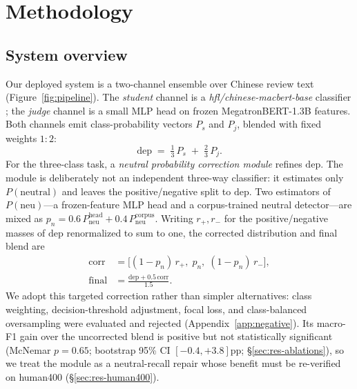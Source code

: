 
\section{Methodology}
\label{sec:method}

\subsection{System overview}
\label{sec:method:system}

Our deployed system is a two-channel ensemble over Chinese review text
(Figure~\ref{fig:pipeline}). The \emph{student} channel is a
\emph{hfl/chinese-macbert-base} classifier \citep{cui2020macbert}; the
\emph{judge} channel is a small MLP head on frozen
MegatronBERT-1.3B features. Both channels emit class-probability
vectors $P_s$ and $P_j$, blended with fixed weights $1{:}2$:
\begin{equation}
  \mathrm{dep} \;=\; \tfrac{1}{3}\,P_s \;+\; \tfrac{2}{3}\,P_j .
  \label{eq:dep}
\end{equation}
For the three-class task, a \emph{neutral probability correction
module} refines $\mathrm{dep}$. The module is deliberately not an
independent three-way classifier: it estimates only
$P(\mathrm{neutral})$ and leaves the positive/negative split to
$\mathrm{dep}$. Two estimators of $P(\mathrm{neu})$---a frozen-feature
MLP head and a corpus-trained neutral detector---are mixed as
$p_n = 0.6\,P_{\mathrm{neu}}^{\mathrm{head}} +
0.4\,P_{\mathrm{neu}}^{\mathrm{corpus}}$. Writing $r_{+}, r_{-}$ for the
positive/negative masses of $\mathrm{dep}$ renormalized to sum to one, the
corrected distribution and final blend are
\begin{equation}
  \begin{aligned}
    \mathrm{corr} &= \big[(1-p_n)\,r_{+},\; p_n,\; (1-p_n)\,r_{-}\big],\\
    \mathrm{final} &= \frac{\mathrm{dep} + 0.5\,\mathrm{corr}}{1.5}.
  \end{aligned}
  \label{eq:spec}
\end{equation}
We adopt this targeted correction rather than simpler alternatives:
class weighting, decision-threshold adjustment, focal loss, and
class-balanced oversampling were evaluated and rejected
(Appendix~\ref{app:negative}). Its macro-F1 gain over the
uncorrected blend is positive but not statistically significant
(McNemar $p{=}0.65$; bootstrap 95\% CI $[-0.4,+3.8]$pp;
\S\ref{sec:res-ablations}), so we treat the module as a neutral-recall
repair whose benefit must be re-verified on human400
(\S\ref{sec:res-human400}).

